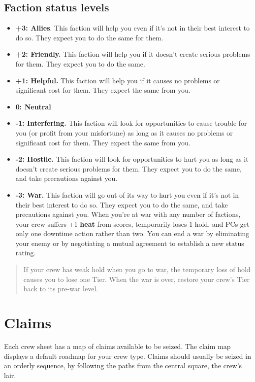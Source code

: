 \documentclass[11pt,fleqn,a5paper]{book}
\newcommand{\gameterm}[1]{\textbf{#1}}
\begin{document}
\subsection{Faction status levels}

\begin{itemize}
	\item \textbf{+3: Allies}. This faction will help you even if it’s not in their best interest to do so. They expect you to do the same for them.
	\item \textbf{+2: Friendly.} This faction will help you if it doesn’t create serious problems for them. They expect you to do the same.
	\item \textbf{+1: Helpful.} This faction will help you if it causes no problems or significant cost for them. They expect the same from you.
	\item \textbf{0: Neutral}
	\item \textbf{-1: Interfering.} This faction will look for opportunities to cause trouble for you (or profit from your misfortune) as long as it causes no problems or significant cost for them. They expect the same from you.
	\item \textbf{-2: Hostile.} This faction will look for opportunities to hurt you as long as it doesn’t create serious problems for them. They expect you to do the same, and take precautions against you.
	\item \textbf{-3: War.} This faction will go out of its way to hurt you even if it’s not in their best interest to do so. They expect you to do the same, and take precautions against you. When you’re at war with any number of factions, your crew suffers +1 \gameterm{heat}  from scores, temporarily loses 1 hold, and PCs get only one downtime action rather than two. You can end a war by eliminating your enemy or by negotiating a mutual agreement to establish a new status rating.
\end{itemize}

\begin{quote}
	If your crew has weak hold when you go to war, the temporary loss of hold causes you to lose one Tier. When the war is over, restore your crew’s Tier back to its pre-war level.
\end{quote}

\section{Claims}

Each crew sheet has a map of claims available to be seized. The claim map displays a default roadmap for your crew type. Claims should usually be seized in an orderly sequence, by following the paths from the central square, the crew’s lair.
\end{document}

